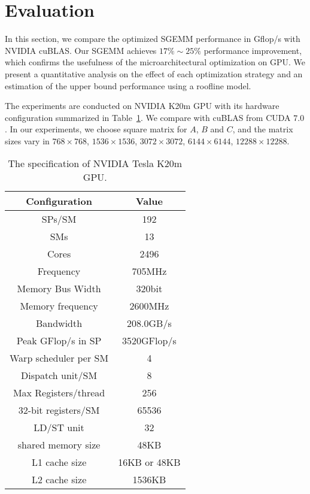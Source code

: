 \section{Evaluation}
\label{sec:experiment}


In this section, we compare the optimized SGEMM performance in Gflop/s with NVIDIA cuBLAS. 
Our SGEMM achieves $17\%\sim 25\%$ performance
improvement, which confirms the usefulness of the microarchitectural optimization on GPU. 
We present 
a quantitative analysis on the effect of each optimization strategy and an estimation of the upper bound performance using a roofline model.

The experiments are conducted on NVIDIA K20m GPU with its hardware configuration summarized in 
Table~\ref{table:k20}. We compare with cuBLAS from CUDA $7.0$. In our experiments, we choose square matrix for $A$, $B$
and $C$, and  the matrix sizes vary in $768\times768$, $1536\times1536$, $3072\times3072$, $6144\times6144$, $12288\times12288$.

\begin{table}[htbp]
\caption{The specification of NVIDIA Tesla K20m GPU.}
\centering
\scalebox{0.8} {
\begin{tabular}{|c|c|}
\hline
Configuration& Value\\
\hline
SPs/SM &192\\
\hline
SMs&13\\
\hline
Cores &2496\\
\hline
Frequency&705MHz\\
\hline
Memory Bus Width&320bit \\
\hline
Memory frequency&2600MHz\\
\hline
Bandwidth&208.0GB/s\\
\hline
Peak GFlop/s in SP&3520GFlop/s\\
\hline
Warp scheduler per SM&4\\
\hline
Dispatch unit/SM&8\\
\hline
Max Registers/thread&256 \\
\hline
    32-bit registers/SM&65536 \\ %
\hline
LD/ST unit&32 \\
\hline
shared memory size&48KB\\
\hline
L1 cache size&16KB or 48KB\\
\hline
L2 cache size&1536KB\\
\hline
\end{tabular}
}
\label{table:k20}
\end{table}


